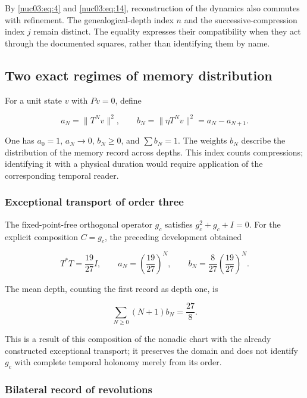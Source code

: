 By \eqref{nuc03:eq:4} and \eqref{nuc03:eq:14}, reconstruction of the dynamics also commutes with refinement. The genealogical-depth index \(n\) and the successive-compression index \(j\) remain distinct. The equality expresses their compatibility when they act through the documented squares, rather than identifying them by name.

\subsection{Two exact regimes of memory distribution}

For a unit state \(v\) with \(Pv=0\), define

\begin{equation}
a_N=\|T^Nv\|^2,\qquad b_N=\|\eta T^Nv\|^2=a_N-a_{N+1}.
\label{nuc03:eq:15}
\end{equation}

One has \(a_0=1\), \(a_N\to0\), \(b_N\geq0\), and \(\sum b_N=1\). The weights \(b_N\) describe the distribution of the memory record across depths. This index counts compressions; identifying it with a physical duration would require application of the corresponding temporal reader.

\subsubsection{Exceptional transport of order three}

The fixed-point-free orthogonal operator \(g_c\) satisfies \(g_c^2+g_c+I=0\). For the explicit composition \(C=g_c\), the preceding development obtained

\begin{equation}
T^*T=\frac{19}{27}I,
\qquad a_N=\left(\frac{19}{27}\right)^N,
\qquad b_N=\frac8{27}\left(\frac{19}{27}\right)^N.
\label{nuc03:eq:16}
\end{equation}

The mean depth, counting the first record as depth one, is

\begin{equation}
\sum_{N\geq0}(N+1)b_N=\frac{27}{8}.
\label{nuc03:eq:17}
\end{equation}

This is a result of this composition of the nonadic chart with the already constructed exceptional transport; it preserves the domain and does not identify \(g_c\) with complete temporal holonomy merely from its order.

\subsubsection{Bilateral record of revolutions}


